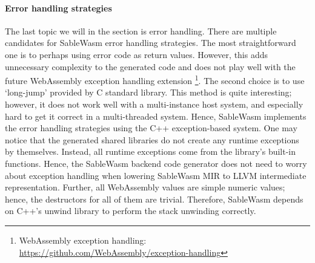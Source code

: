 \paragraph{Error handling strategies}
The last topic we will in the section is error handling. There are multiple candidates for SableWasm error handling strategies. The most straightforward one is to perhaps using error code as return values. However, this adds unnecessary complexity to the generated code and does not play well with the future WebAssembly exception handling extension \footnote{WebAssembly exception handling: \url{https://github.com/WebAssembly/exception-handling}}. The second choice is to use `long-jump' provided by C standard library. This method is quite interesting; however, it does not work well with a multi-instance host system, and especially hard to get it correct in a multi-threaded system. Hence, SableWasm implements the error handling strategies using the C++ exception-based system. One may notice that the generated shared libraries do not create any runtime exceptions by themselves. Instead, all runtime exceptions come from the library's built-in functions. Hence, the SableWasm backend code generator does not need to worry about exception handling when lowering SableWasm MIR to LLVM intermediate representation. Further, all WebAssembly values are simple numeric values; hence, the destructors for all of them are trivial. Therefore, SableWasm depends on C++'s unwind library to perform the stack unwinding correctly.